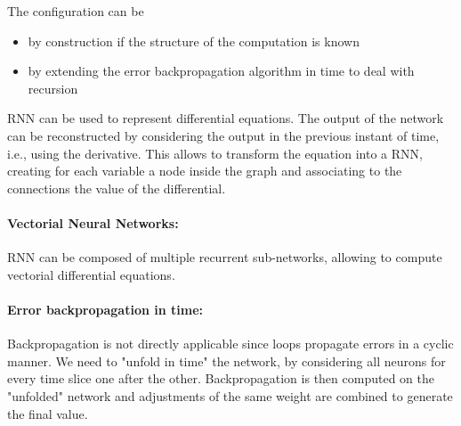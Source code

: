 The configuration can be
\begin{itemize}
	\item by construction if the structure of the computation is known
	\item by extending the error backpropagation algorithm in time to deal with recursion
\end{itemize}

RNN can be used to represent differential equations. The output of the network can be reconstructed by considering the output in the previous instant of time, i.e., using the derivative. This allows to transform the equation into a RNN, creating for each variable a node inside the graph and associating to the connections the value of the differential.\\

\paragraph{Vectorial Neural Networks:} RNN can be composed of multiple recurrent sub-networks, allowing to compute vectorial differential equations.\\

\paragraph{Error backpropagation in time:} Backpropagation is not directly applicable since loops propagate errors in a cyclic manner. We need to "unfold in time" the network, by considering all neurons for every time slice one after the other. Backpropagation is then computed on the "unfolded" network and adjustments of the same weight are combined to generate the final value.\\
